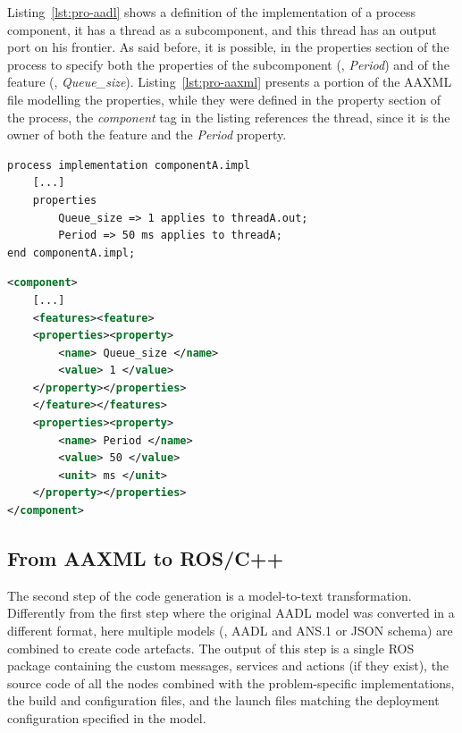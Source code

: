 Listing~\ref{lst:pro-aadl} shows a definition of the implementation of a process component, it has a thread as a subcomponent, and this thread has an output port on his frontier. As said before, it is possible, in the properties section of the process to specify both the properties of the subcomponent (\ie, \textit{Period}) and of the feature (\ie, \textit{Queue\_size}). Listing~\ref{lst:pro-aaxml} presents a portion of the AAXML file modelling the properties, while they were defined in the property section of the process, the \textit{component} tag in the listing references the thread, since it is the owner of both the feature and the \textit{Period} property. 

\begin{lstlisting}[language=AADL,caption={Minimal AADL model containing properties},label=lst:pro-aadl]
process implementation componentA.impl
	[...]
	properties
		Queue_size => 1 applies to threadA.out;
		Period => 50 ms applies to threadA;
end componentA.impl;
\end{lstlisting}

\begin{lstlisting}[language=XML,caption={AAXML description of AADL properties},label=lst:pro-aaxml]
<component>
	[...]
	<features><feature>
	<properties><property>
		<name> Queue_size </name>
		<value> 1 </value>
	</property></properties>
	</feature></features>
	<properties><property>
		<name> Period </name>
		<value> 50 </value>
		<unit> ms </unit>
	</property></properties>
</component>
\end{lstlisting}

\subsection{From AAXML to ROS/C++}
\label{sec:xml-cpp}
The second step of the code generation is a model-to-text transformation. Differently from the first step where the original AADL model was converted in a different format, here multiple models (\ie, AADL and ANS.1 or JSON schema) are combined to create code artefacts. The output of this step is a single ROS package containing the custom messages, services and actions (if they exist), the source code of all the nodes combined with the problem-specific implementations, the build and configuration files, and the launch files matching the deployment configuration specified in the model.

